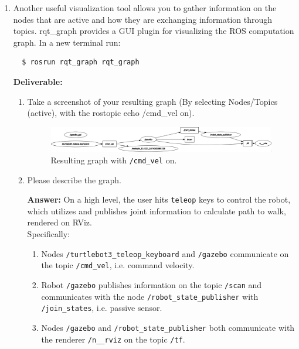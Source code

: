 \documentclass[12pt]{article}
\begin{document}
\begin{enumerate}
\item  Another useful visualization tool allows you to gather information on the nodes that are active and how they are exchanging information through topics. rqt\_graph provides a GUI plugin for visualizing the ROS computation graph. In a new terminal run:
\begin{verbatim}
  $ rosrun rqt_graph rqt_graph
\end{verbatim}

\textbf{Deliverable:} 
\begin{enumerate}
    \item Take a screenshot of your resulting graph (By selecting Nodes/Topics (active), with the rostopic echo /cmd\_vel on).

    \begin{figure}[H]
      \centering\includegraphics[width=14cm]{images/rosgraph_cmd_vel.png}\vspace{-10pt}
      \caption{Resulting graph with \texttt{/cmd_vel} on.}\label{fig:cmd_vel}
      \end{figure}

    \item Please describe the graph. 
    
    \textbf{Answer: }On a high level, the user hits \texttt{teleop} keys to control the robot, which utilizes and publishes joint information to calculate path to walk, rendered on RViz.
    \\Specifically:
    \begin{enumerate}
      \item Nodes \texttt{/turtlebot3_teleop_keyboard} and \texttt{/gazebo} communicate on the topic \texttt{/cmd_vel}, i.e. command velocity. 
      \item Robot \texttt{/gazebo} publishes information on the topic \texttt{/scan} and communicates with the node \texttt{/robot_state_publisher} with \texttt{/join_states}, i.e. passive sensor.
      \item Nodes \texttt{/gazebo} and \texttt{/robot_state_publisher} both communicate with the renderer \texttt{/n__rviz} on the topic \texttt{/tf}.
    \end{enumerate}

\end{enumerate}

\end{enumerate}
\end{document}
